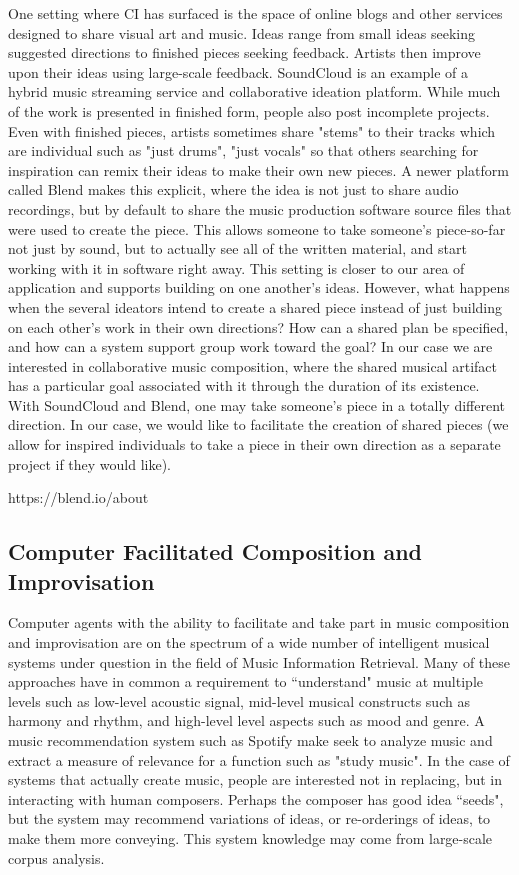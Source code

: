 \documentclass[final,authoryear,11pt,times]{elsarticle}
\begin{document}
One setting where CI has surfaced is the space of online blogs and other services designed to share visual art and music. Ideas range from small ideas seeking suggested directions to finished pieces seeking feedback. Artists then improve upon their ideas using large-scale feedback. SoundCloud is an example of a hybrid music streaming service and collaborative ideation platform. While much of the work is presented in finished form, people also post incomplete projects. Even with finished pieces, artists sometimes share "stems" to their tracks which are individual such as "just drums", "just vocals" so that others searching for inspiration can remix their ideas to make their own new pieces. A newer platform called Blend makes this explicit, where the idea is not just to share audio recordings, but by default to share the music production software source files that were used to create the piece. This allows someone to take someone's piece-so-far not just by sound, but to actually see all of the written material, and start working with it in software right away. This setting is closer to our area of application and supports building on one another's ideas. However, what happens when the several ideators intend to create a shared piece instead of just building on each other's work in their own directions? How can a shared plan be specified, and how can a system support group work toward the goal? In our case we are interested in collaborative music composition, where the shared musical artifact has a particular goal associated with it through the duration of its existence. With SoundCloud and Blend, one may take someone's piece in a totally different direction. In our case, we would like to facilitate the creation of shared pieces (we allow for inspired individuals to take a piece in their own direction as a separate project if they would like).

https://blend.io/about 

\subsection{Computer Facilitated Composition and Improvisation}

Computer agents with the ability to facilitate and take part in music composition and improvisation are on the spectrum of a wide number of intelligent musical systems under question in the field of Music Information Retrieval. Many of these approaches have in common a requirement to ``understand" music at multiple levels such as low-level acoustic signal, mid-level musical constructs such as harmony and rhythm, and high-level level aspects such as mood and genre. A music recommendation system such as Spotify make seek to analyze music and extract a measure of relevance for a function such as "study music". In the case of systems that actually create music, people are interested not in replacing, but in interacting with human composers. Perhaps the composer has good idea ``seeds", but the system may recommend variations of ideas, or re-orderings of ideas, to make them more conveying. This system knowledge may come from large-scale corpus analysis.
\end{document}
